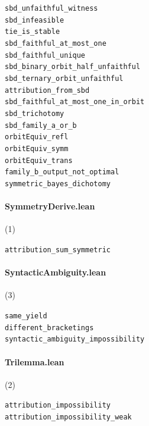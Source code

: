 {\footnotesize
\texttt{sbd\_unfaithful\_witness}\\
\texttt{sbd\_infeasible}\\
\texttt{tie\_is\_stable}\\
\texttt{sbd\_faithful\_at\_most\_one}\\
\texttt{sbd\_faithful\_unique}\\
\texttt{sbd\_binary\_orbit\_half\_unfaithful}\\
\texttt{sbd\_ternary\_orbit\_unfaithful}\\
\texttt{attribution\_from\_sbd}\\
\texttt{sbd\_faithful\_at\_most\_one\_in\_orbit}\\
\texttt{sbd\_trichotomy}\\
\texttt{sbd\_family\_a\_or\_b}\\
\texttt{orbitEquiv\_refl}\\
\texttt{orbitEquiv\_symm}\\
\texttt{orbitEquiv\_trans}\\
\texttt{family\_b\_output\_not\_optimal}\\
\texttt{symmetric\_bayes\_dichotomy}\\
}

\paragraph{SymmetryDerive.lean} (1)

{\footnotesize
\texttt{attribution\_sum\_symmetric}\\
}

\paragraph{SyntacticAmbiguity.lean} (3)

{\footnotesize
\texttt{same\_yield}\\
\texttt{different\_bracketings}\\
\texttt{syntactic\_ambiguity\_impossibility}\\
}

\paragraph{Trilemma.lean} (2)

{\footnotesize
\texttt{attribution\_impossibility}\\
\texttt{attribution\_impossibility\_weak}\\
}

